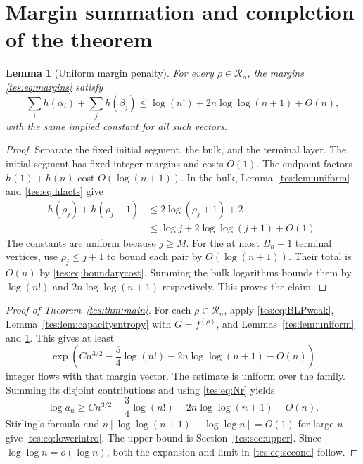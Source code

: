 \documentclass[11pt,a4paper]{article}
\newtheorem{lemma}[theorem]{Lemma}
\theoremstyle{remark}\newtheorem{remark}[theorem]{Remark}
\numberwithin{equation}{section}
\begin{document}
\section{Margin summation and completion of the theorem}\label{tes:sec:summation}
\begin{lemma}[Uniform margin penalty]\label{tes:lem:penalty}
For every $\rho\in\mathcal R_n$, the margins \eqref{tes:eq:margins} satisfy
\begin{equation}\label{tes:eq:penalty}
\sum_i h(\alpha_i)+\sum_jh(\beta_j)
\le\log(n!)+2n\log\log(n+1)+O(n),
\end{equation}
with the same implied constant for all such vectors.
\end{lemma}
\begin{proof}
Separate the fixed initial segment, the bulk, and the terminal layer. The initial segment has fixed integer margins and costs $O(1)$. The endpoint factors $h(1)+h(n)$ cost $O(\log(n+1))$. In the bulk, Lemma~\ref{tes:lem:uniform} and \eqref{tes:eq:hfacts} give
\begin{align*}
h(\rho_j)+h(\rho_j-1)
&\le2\log(\rho_j+1)+2\\
&\le\log j+2\log\log(j+1)+O(1).
\end{align*}
The constants are uniform because $j\ge M$. For the at most $B_n+1$ terminal vertices, use $\rho_j\le j+1$ to bound each pair by $O(\log(n+1))$. Their total is $O(n)$ by \eqref{tes:eq:boundarycost}. Summing the bulk logarithms bounds them by $\log(n!)$ and $2n\log\log(n+1)$ respectively. This proves the claim.
\end{proof}

\begin{proof}[Proof of Theorem~\ref{tes:thm:main}]
For each $\rho\in\mathcal R_n$, apply \eqref{tes:eq:BLPweak}, Lemma~\ref{tes:lem:capacityentropy} with $G=f^{(\rho)}$, and Lemmas~\ref{tes:lem:uniform} and \ref{tes:lem:penalty}. This gives at least
\begin{equation}\label{tes:eq:eachmargin}
\exp\left(Cn^{3/2}-\frac54\log(n!)-2n\log\log(n+1)-O(n)\right)
\end{equation}
integer flows with that margin vector. The estimate is uniform over the family. Summing its disjoint contributions and using \eqref{tes:eq:Nr} yields
\begin{equation}\label{tes:eq:lowerfactorial}
\log a_n\ge Cn^{3/2}-\frac34\log(n!)-2n\log\log(n+1)-O(n).
\end{equation}
Stirling's formula and $n[\log\log(n+1)-\log\log n]=O(1)$ for large $n$ give \eqref{tes:eq:lowerintro}. The upper bound is Section~\ref{tes:sec:upper}. Since $\log\log n=o(\log n)$, both the expansion and limit in \eqref{tes:eq:second} follow.
\end{proof}
\end{document}

